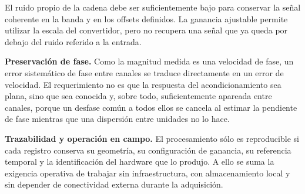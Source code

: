 El ruido propio de la cadena debe ser suficientemente bajo para conservar la señal coherente en la banda y en los offsets definidos. La ganancia ajustable permite utilizar la escala del convertidor, pero no recupera una señal que ya queda por debajo del ruido referido a la entrada.

\textbf{Preservación de fase.} Como la magnitud medida es una velocidad de fase, un error sistemático de fase entre canales se traduce directamente en un error de velocidad. El requerimiento no es que la respuesta del acondicionamiento sea plana, sino que sea conocida y, sobre todo, suficientemente apareada entre canales, porque un desfase común a todos ellos se cancela al estimar la pendiente de fase mientras que una dispersión entre unidades no lo hace.

\textbf{Trazabilidad y operación en campo.} El procesamiento sólo es reproducible si cada registro conserva su geometría, su configuración de ganancia, su referencia temporal y la identificación del hardware que lo produjo. A ello se suma la exigencia operativa de trabajar sin infraestructura, con almacenamiento local y sin depender de conectividad externa durante la adquisición.
